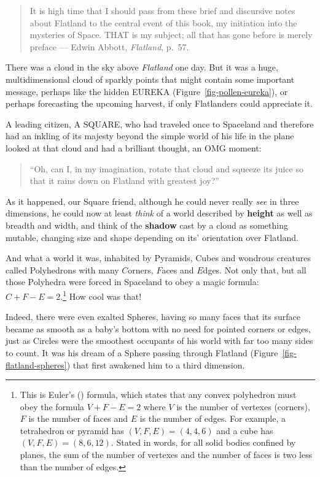 \documentclass[
  letterpaper,
  10pt,
  krantz2]{krantz}
\begin{document}
{\begin{quote}
It is high time that I should pass from these brief and discursive notes
about Flatland to the central event of this book, my initiation into the
mysteries of Space. THAT is my subject; all that has gone before is
merely preface --- Edwin Abbott, \emph{Flatland}, p.~57.
\end{quote}

There was a cloud in the sky above \emph{Flatland} one day. But it was a
huge, multidimensional cloud of sparkly points that might contain some
important message, perhaps like the hidden EUREKA
(Figure~\ref{fig-pollen-eureka}), or perhaps forecasting the upcoming
harvest, if only Flatlanders could appreciate it.

A leading citizen, A SQUARE, who had traveled once to Spaceland and
therefore had an inkling of its majesty beyond the simple world of his
life in the plane looked at that cloud and had a brilliant thought, an
OMG moment:

\begin{quote}
``Oh, can I, in my imagination, rotate that cloud and squeeze its juice
so that it rains down on Flatland with greatest joy?''
\end{quote}

As it happened, our Square friend, although he could never really
\emph{see} in three dimensions, he could now at least \emph{think} of a
world described by \textbf{height} as well as breadth and width, and
think of the \textbf{shadow} cast by a cloud as something mutable,
changing size and shape depending on its' orientation over Flatland.

And what a world it was, inhabited by Pyramids, Cubes and wondrous
creatures called Polyhedrons with many \(C\)orners, \(F\)aces and
\(E\)dges. Not only that, but all those Polyhedra were forced in
Spaceland to obey a magic formula: \(C + F - E = 2\).\footnote{This is
  Euler's () formula, which states that
  any convex polyhedron must obey the formula \(V + F - E = 2\) where
  \(V\) is the number of vertexes (corners), \(F\) is the number of
  faces and \(E\) is the number of edges. For example, a tetrahedron or
  pyramid has \((V, F, E) = (4, 4, 6)\) and a cube has
  \((V, F, E) = (8, 6, 12)\). Stated in words, for all solid bodies
  confined by planes, the sum of the number of vertexes and the number
  of faces is two less than the number of edges.} How cool was that!

Indeed, there were even exalted Spheres, having so many faces that its
surface became as smooth as a baby's bottom with no need for pointed
corners or edges, just as Circles were the smoothest occupants of his
world with far too many sides to count. It was his dream of a Sphere
passing through Flatland (Figure~\ref{fig-flatland-spheres}) that first
awakened him to a third dimension.

}
\end{document}
